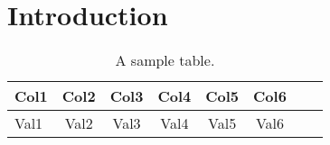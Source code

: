 \documentclass{article}
\newcommand{\ra}[1]{\renewcommand{\arraystretch}{#1}}
\begin{document}


\tableofcontents

\section{Introduction}
\label{sec:introduction}


\begin{table}[ht]\centering
    \ra{1.3}
    \begin{tabular}{@{}lccccccc@{}}\toprule
    Col1    & Col2  & Col3  & Col4  & Col5  & Col6 \\
    \midrule
    Val1    & Val2  & Val3  & Val4  & Val5  & Val6 \\
    \bottomrule
    \end{tabular}
    \caption{A sample table.}
    \label{tab:label}
\end{table}
\end{document}
